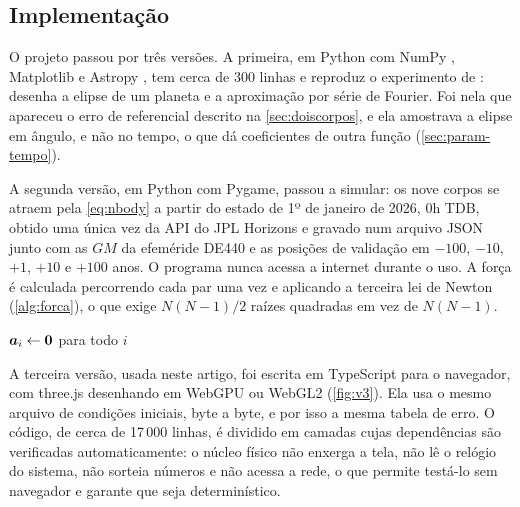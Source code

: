 \subsection{Implementação}\label{cap:implementacao}

O projeto passou por três versões. A primeira, em Python com NumPy \cite{harris2020}, Matplotlib e Astropy \cite{astropy2022}, tem cerca de 300 linhas e reproduz o experimento de : desenha a elipse de um planeta e a aproximação por série de Fourier. Foi nela que apareceu o erro de referencial descrito na \autoref{sec:doiscorpos}, e ela amostrava a elipse em ângulo, e não no tempo, o que dá coeficientes de outra função (\autoref{sec:param-tempo}).

A segunda versão, em Python com Pygame, passou a simular: os nove corpos se atraem pela \autoref{eq:nbody} a partir do estado de 1º de janeiro de 2026, 0h TDB, obtido uma única vez da API do JPL Horizons \cite{giorgini1996} e gravado num arquivo JSON junto com as $GM$ da efeméride DE440 \cite{park2021} e as posições de validação em $-100$, $-10$, $+1$, $+10$ e $+100$ anos. O programa nunca acessa a internet durante o uso. A força é calculada percorrendo cada par uma vez e aplicando a terceira lei de Newton (\autoref{alg:forca}), o que exige $N(N-1)/2$ raízes quadradas em vez de $N(N-1)$.

\begin{algorithm}[htb]
  \caption{Aceleração gravitacional mútua de $N$ corpos}\label{alg:forca}
  $\bm{a}_i \leftarrow \bm{0}$ para todo $i$\;
\end{algorithm}

A terceira versão, usada neste artigo, foi escrita em TypeScript para o navegador, com three.js \cite{threejs} desenhando em WebGPU \cite{webgpu} ou WebGL2 (\autoref{fig:v3}). Ela usa o mesmo arquivo de condições iniciais, byte a byte, e por isso a mesma tabela de erro. O código, de cerca de 17\,000 linhas, é dividido em camadas cujas dependências são verificadas automaticamente: o núcleo físico não enxerga a tela, não lê o relógio do sistema, não sorteia números e não acessa a rede, o que permite testá-lo sem navegador e garante que seja determinístico.

